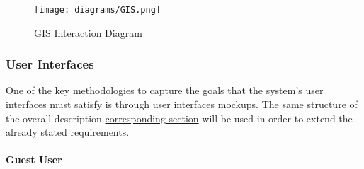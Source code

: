 	\begin{figure}[h]
		\centering
		\texttt{[image: diagrams/GIS.png]}
		\caption{
			\label{fig:externalGIS} GIS Interaction Diagram}
	\end{figure}

\subsubsection{User Interfaces}

	One of the key methodologies to capture the goals that the system's user interfaces must satisfy is through user interfaces mockups. The same structure of the overall description \hyperref[sec:goals]{corresponding section} will be used in order to extend the already stated requirements.

 \paragraph{Guest User}

